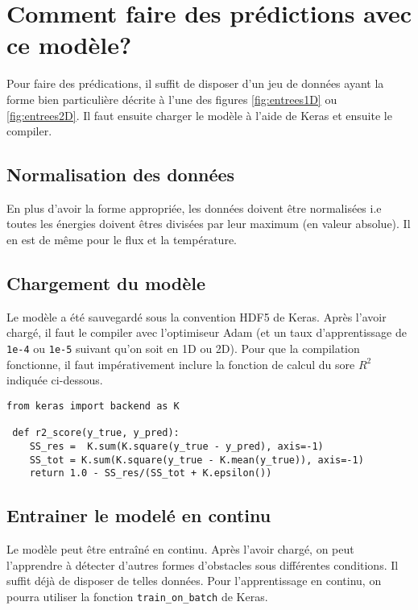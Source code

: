 

\chapter{Comment faire des prédictions avec ce modèle?} %

\label{AppendixB} %
Pour faire des prédications, il suffit de disposer d'un jeu de données ayant la forme bien particulière décrite à l'une des figures \ref{fig:entrees1D} ou \ref{fig:entrees2D}. Il faut ensuite charger le modèle à l'aide de Keras et ensuite le compiler.

\section{Normalisation des données}
En plus d'avoir la forme appropriée, les données doivent être normalisées i.e toutes les énergies doivent êtres divisées par leur maximum (en valeur absolue). Il en est de même pour le flux et la température.

\section{Chargement du modèle}
Le modèle a été sauvegardé sous la convention HDF5 de Keras. Après l'avoir chargé, il faut le compiler avec l'optimiseur Adam (et un taux d'apprentissage de \verb|1e-4| ou \verb|1e-5| suivant qu'on soit en 1D ou 2D). Pour que la compilation fonctionne, il faut impérativement inclure la fonction de calcul du sore $R^2$ indiquée ci-dessous.

\begin{verbatim}
from keras import backend as K

 def r2_score(y_true, y_pred):
    SS_res =  K.sum(K.square(y_true - y_pred), axis=-1) 
    SS_tot = K.sum(K.square(y_true - K.mean(y_true)), axis=-1)
    return 1.0 - SS_res/(SS_tot + K.epsilon())
\end{verbatim}


\section{Entrainer le modelé en continu}
Le modèle peut être entraîné en continu. Après l'avoir chargé, on peut l'apprendre à détecter d'autres formes d'obstacles sous différentes conditions. Il suffit déjà de disposer de telles données. Pour l'apprentissage en continu, on pourra utiliser la fonction \verb|train_on_batch| de Keras.

